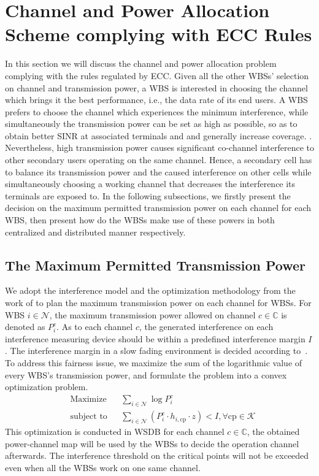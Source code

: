 \documentclass[times]{ettauth}
\newcommand{\ie}{i.e., }
\theoremstyle{mytheoremstyle}
\theoremstyle{mytheoremstyle}
\theoremstyle{mytheoremstyle}
\begin{document}
\section{Channel and Power Allocation Scheme complying with ECC Rules}

In this section we will discuss the channel and power allocation problem complying with the rules regulated by ECC.
Given all the other WBSs' selection on channel and transmission power, a WBS is interested in choosing the channel which brings it the best performance, \ie the data rate of its end users.
A WBS prefers to choose the channel which experiences the minimum interference, while simultaneously the transmission power can be set as high as possible, so as to obtain better SINR at associated terminals and and generally increase coverage. \cite{wuinfocom09, HoangPowerChannel2010}. 
Nevertheless, high transmission power causes significant co-channel interference to other secondary users operating on the same channel. 
Hence, a secondary cell has to balance its transmission power and the caused interference on other cells while simultaneously choosing a working channel that decreases the interference its terminals are exposed to.
In the following subsections, we firstly present the decision on the maximum permitted transmission power on each channel for each WBS, then present how do the WBSs make use of these powers in both centralized and distributed manner respectively.
\subsection{The Maximum Permitted Transmission Power}
\label{powermap}

We adopt the interference model and the optimization methodology from the work of \cite{multipleIntf_pimrc11} to plan the maximum transmission power on each channel for WBSs.
%
For WBS $i\in \mathcal{N}$, the maximum transmission power allowed on channel $c\in \mathbb{C}$ is denoted as $P_i^c$. 
As to each channel $c$, the generated interference on each interference measuring device should be within a predefined interference margin $I$.
The interference margin in a slow fading environment is decided according to~\cite{aggregate_interference_shadow_fading_2010}.
To address this fairness issue, we maximize the sum of the logarithmic value of every WBS's transmission power, and formulate the problem into a convex optimization problem.
	\begin{equation}
		\label{cvx}
		\begin{aligned}
		& {\text{Maximize}}
		& & \sum_{i\in \mathcal{N}} \log P^c_i \\
		& \text{subject to}
		& & \sum_{i\in \mathcal{N}} (P^c_i \cdot h_{i,\text{cp}}\cdot z) < I, \forall\text{cp} \in \mathcal{K}
		\end{aligned}
	\end{equation}
This optimization is conducted in WSDB for each channel $c\in \mathbb{C}$, the obtained power-channel map will be used by the WBSs to decide the operation channel afterwards.
The interference threshold on the critical points will not be exceeded even when all the WBSs work on one same channel.
\end{document}
